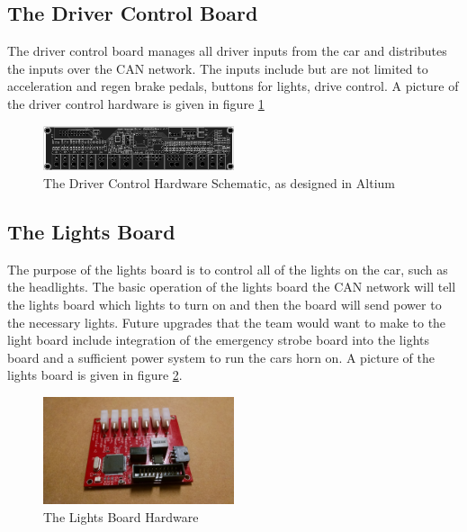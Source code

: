\documentclass[titlepage]{article}
\begin{document}
    \subsection{The Driver Control Board}
    The driver control board manages all driver inputs from the car and
    distributes the inputs over the CAN network. The inputs include but
    are not limited to acceleration and regen brake pedals, buttons for
    lights, drive control. A picture of the driver control hardware is
    given in figure \ref{fig:driver}
    \begin{figure}[H]
        \centering
        \includegraphics[width=0.5\textwidth]{images/driver.png}
        \caption{The Driver Control Hardware Schematic, as designed in
                 Altium}
        \label{fig:driver}
    \end{figure}
    \subsection{The Lights Board}
    The purpose of the lights board is to control all of the lights on
    the car, such as the headlights. The basic operation of the lights
    board the CAN network will tell the lights board which lights to
    turn on and then the board will send power to the necessary lights.
    Future upgrades that the team would want to make to the light board
    include integration of the emergency strobe board into the lights
    board and a sufficient power system to run the cars horn on. A
    picture of the lights board is given in figure \ref{fig:lights_HW}.
    \begin{figure}[H]
        \centering
        \includegraphics[width=0.5\textwidth]{images/light_board.jpeg}
        \caption{The Lights Board Hardware}
        \label{fig:lights_HW}
    \end{figure}
\end{document}
